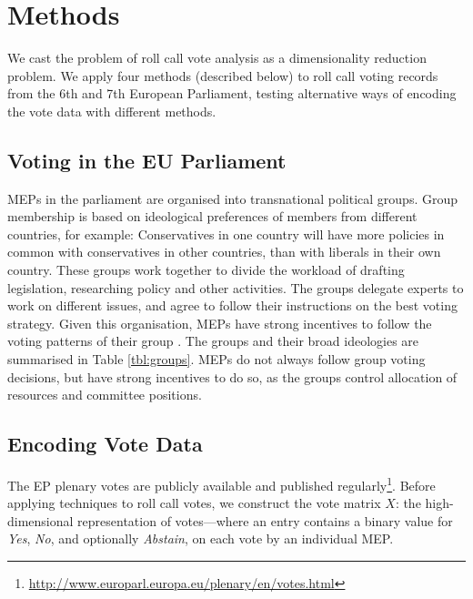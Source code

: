 \documentclass{llncs}
\begin{document}
\section{Methods}
\label{sec:methods}

We cast the problem of roll call vote analysis as a dimensionality reduction problem. We apply four methods (described below) to roll call voting records from the 6th and 7th European Parliament, testing alternative ways of encoding the vote data with different methods.

\subsection{Voting in the EU Parliament}
MEPs in the parliament are organised into transnational political groups. Group membership is based on ideological preferences of members from different countries, for example: Conservatives in one country will have more policies in common with conservatives in other countries, than with liberals in their own country. These groups work together to divide the workload of drafting legislation, researching policy and other activities. The groups delegate experts to work on different issues, and agree to follow their instructions on the best voting strategy. Given this organisation, MEPs have strong incentives to follow the voting patterns of their group \cite{Hix821}. The groups and their broad ideologies are summarised in Table \ref{tbl:groups}. MEPs do not always follow group voting decisions, but have strong incentives to do so, as the groups control allocation of resources and committee positions.

\subsection{Encoding Vote Data}

The EP plenary votes are publicly available and published regularly\footnote{\url{http://www.europarl.europa.eu/plenary/en/votes.html}}. Before applying techniques to roll call votes, we construct the vote matrix $X$: the high-dimensional representation of votes---where an entry contains a binary value for \emph{Yes}, \emph{No}, and optionally \emph{Abstain}, on each vote by an individual MEP. 
\end{document}
